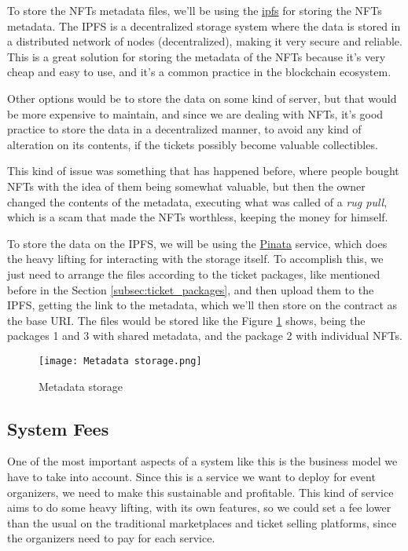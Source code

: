 To store the NFTs metadata files, we'll be using the
\href{https://ipfs.tech/}{\gls{ipfs}} for storing the NFTs metadata. The IPFS
is a decentralized storage system where the data is stored in a distributed
network of nodes (decentralized), making it very secure and reliable. This is a
great solution for storing the metadata of the NFTs because it's very cheap and
easy to use, and it's a common practice in the blockchain ecosystem.

Other options would be to store the data on some kind of server, but that would
be more expensive to maintain, and since we are dealing with NFTs, it's good
practice to store the data in a decentralized manner, to avoid any kind of
alteration on its contents, if the tickets possibly become valuable
collectibles.

This kind of issue was something that has happened before, where people bought
NFTs with the idea of them being somewhat valuable, but then the owner changed
the contents of the metadata, executing what was called of a \textit{rug pull},
which is a scam that made the NFTs worthless, keeping the money for himself.

To store the data on the IPFS, we will be using the
\href{https://www.pinata.cloud/}{Pinata} service, which does the heavy lifting
for interacting with the storage itself. To accomplish this, we just need to
arrange the files according to the ticket packages, like mentioned before in
the Section \ref{subsec:ticket_packages}, and then upload them to the IPFS,
getting the link to the metadata, which we'll then store on the contract as the
base URI. The files would be stored like the Figure \ref{fig:metadata_storage}
shows, being the packages 1 and 3 with shared metadata, and the package 2 with
individual NFTs.

\begin{figure}[H]
	\texttt{[image: Metadata storage.png]}
	\centering
	\caption{Metadata storage}
	\label{fig:metadata_storage}
\end{figure}

\subsection{System Fees}
\label{subsec:system_fees}

One of the most important aspects of a system like this is the business model
we have to take into account. Since this is a service we want to deploy for
event organizers, we need to make this sustainable and profitable. This kind of
service aims to do some heavy lifting, with its own features, so we could set a
fee lower than the usual on the traditional marketplaces and ticket selling
platforms, since the organizers need to pay for each service.


